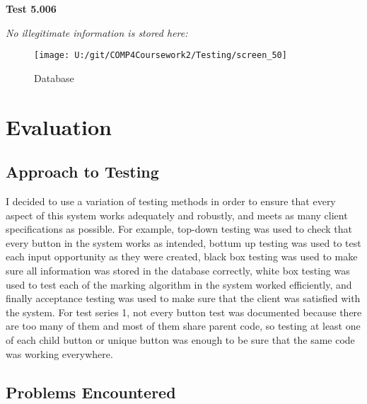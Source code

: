 \textbf{Test 5.006}

\textit{No illegitimate information is stored here: }

\begin{figure}[H]
    \label{fig: Second Screen}\caption{Database}
    \texttt{[image: U:/git/COMP4Coursework2/Testing/screen\_50]}
\end{figure}

\section{Evaluation}

\subsection{Approach to Testing}

I decided to use a variation of testing methods in order to ensure that every aspect of this system works adequately and robustly, and meets as many client specifications as possible. For example, top-down testing was used to check that every button in the system works as intended, bottum up testing was used to test each input opportunity as they were created, black box testing was used to make sure all information was stored in the database correctly, white box testing was used to test each of the marking algorithm in the system worked efficiently, and finally acceptance testing was used to make sure that the client was satisfied with the system. For test series 1, not every button test was documented because there are too many of them and most of them share parent code, so testing at least one of each child button or unique button was enough to be sure that the same code was working everywhere.

\subsection{Problems Encountered}

